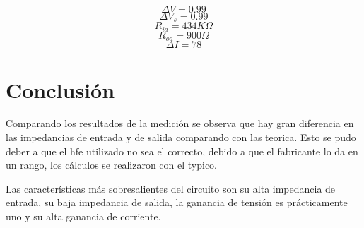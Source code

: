 \documentclass[../../main.tex]{subfiles}
\begin{document}
$$\Delta V = 0.99$$
$$ \Delta V_s =0.99 $$
$$ R_{ia} = 434K\Omega $$
$$R_{oa}=900\Omega $$
$$\Delta I= 78 $$


\section{Conclusión}
Comparando los resultados de la medición se observa que hay gran diferencia en las impedancias de entrada y de salida comparando con las teorica. Esto se pudo deber a que el hfe utilizado no sea el correcto, debido a que el fabricante lo da en un rango, los cálculos se realizaron con el typico. 
\par Las características más sobresalientes del circuito son su alta impedancia de entrada, su baja impedancia de salida, la ganancia de tensión es prácticamente uno y su alta ganancia de corriente.
\end{document}
